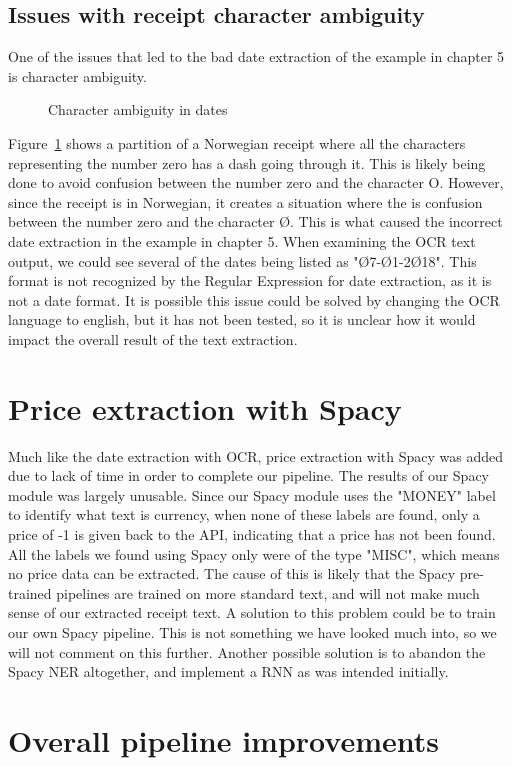 \subsection{Issues with receipt character ambiguity}\label{subsec:issues-with-receipt-character-ambiguity}
One of the issues that led to the bad date extraction of the example in chapter 5 is character ambiguity.

\begin{figure}[h]
    \caption{Character ambiguity in dates}
    \label{fig:zeroletter}
\end{figure}

Figure~\ref{fig:zeroletter} shows a partition of a Norwegian receipt where all the characters representing the number
zero has a dash going through it.
This is likely being done to avoid confusion between the number zero and the character O.
However, since the receipt is in Norwegian, it creates a situation where the is confusion between the number zero and the character Ø.
This is what caused the incorrect date extraction in the example in chapter 5.
When examining the OCR text output, we could see several of the dates being listed as "Ø7-Ø1-2Ø18".
This format is not recognized by the Regular Expression for date extraction, as it is not a date format.
It is possible this issue could be solved by changing the OCR language to english, but it has not been tested, so it is unclear how it would impact the overall result of the text extraction.

\section{Price extraction with Spacy}\label{sec:price-extraction-with-spacy}
Much like the date extraction with OCR, price extraction with Spacy was added due to lack of time in order to complete our pipeline.
The results of our Spacy module was largely unusable.
Since our Spacy module uses the "MONEY" label to identify what text is currency, when none of these labels are found, only a price of -1 is given back to the API, indicating that a price has not been found.
All the labels we found using Spacy only were of the type "MISC", which means no price data can be extracted.
The cause of this is likely that the Spacy pre-trained pipelines are trained on more standard text, and will not make much sense of our extracted receipt text.
A solution to this problem could be to train our own Spacy pipeline.
This is not something we have looked much into, so we will not comment on this further.
Another possible solution is to abandon the Spacy NER altogether, and implement a RNN as was intended initially.

\section{Overall pipeline improvements}\label{sec:overall-pipeline-improvements}